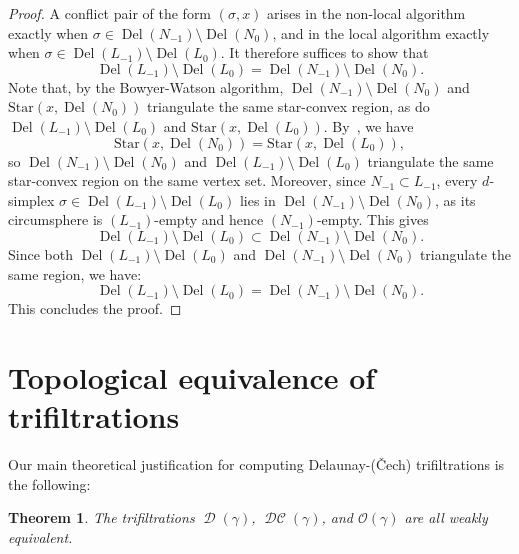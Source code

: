 \documentclass[11pt]{amsart}
\DeclareMathOperator{\DelT}{Del}
\DeclareMathOperator{\Del}{\mathcal{D}}
\DeclareMathOperator{\DelCech}{\mathcal{DC}}
\newcommand{\Offset}[0]{\mathcal{O}}
\newcommand{\St}{\mathrm{Star}}
\theoremstyle{plain}
\newtheorem{theorem}{Theorem}[section]
\theoremstyle{definition}
\theoremstyle{remark}
\begin{document}
\begin{proof}
A conflict pair of the form $(\sigma,x)$ arises in the non-local algorithm exactly when $\sigma\in \DelT(N_{-1}) \setminus \DelT(N_0)$, and in the local algorithm exactly when 
 $\sigma \in \DelT(L_{-1}) \setminus \DelT(L_0)$.  
        It therefore suffices to show that
        \[\DelT(L_{-1}) \setminus \DelT(L_0) = \DelT(N_{-1}) \setminus \DelT(N_0).\] 
        Note that, by the Bowyer-Watson algorithm, $\DelT(N_{-1}) \setminus \DelT(N_0)$ and $\St(x, \DelT(N_0))$
        triangulate the same star-convex region, as do $\DelT(L_{-1}) \setminus \DelT(L_0)$
        and $\St(x, \DelT(L_0))$. 
        By~, we have
        \[\St(x, \DelT(N_0)) = \St(x, \DelT(L_0)),\]
        so $\DelT(N_{-1}) \setminus \DelT(N_0)$ and $\DelT(L_{-1}) \setminus \DelT(L_0)$
        triangulate the same star-convex region on the same vertex set.
        Moreover, since $N_{-1} \subset L_{-1}$, every $d$-simplex $\sigma \in \DelT(L_{-1}) \setminus \DelT(L_0)$
        lies in $\DelT(N_{-1}) \setminus \DelT(N_0)$, as its circumsphere is $(L_{-1})$-empty
        and hence $(N_{-1})$-empty. 
        This gives
        \[\DelT(L_{-1}) \setminus \DelT(L_0) \subset \DelT(N_{-1}) \setminus \DelT(N_0).\]
        Since both $\DelT(L_{-1}) \setminus \DelT(L_0)$ and $\DelT(N_{-1}) \setminus \DelT(N_0)$
        triangulate the same region, we have:
        \[\DelT(L_{-1}) \setminus \DelT(L_0) = \DelT(N_{-1}) \setminus \DelT(N_0).\]        
    This concludes the proof.
\end{proof}
%
%
%
%
\section{Topological equivalence of trifiltrations}\label{sec:top_equiv}
Our main theoretical justification for computing Delaunay-(\v Cech) trifiltrations is the following:  
%

\begin{theorem}\label{thm:main} The trifiltrations $\Del(\gamma)$, $\DelCech(\gamma)$, and $\Offset(\gamma)$  are all weakly equivalent.
\end{theorem}
\end{document}
